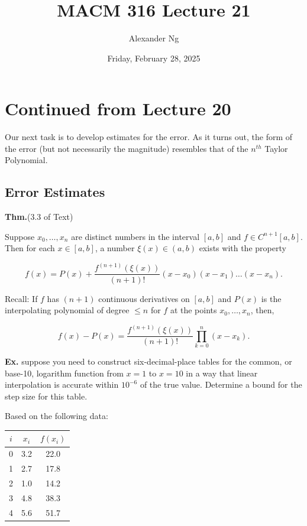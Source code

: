 \documentclass[12pt]{article}
\newcommand{\thm}{\textbf{Thm.}\xspace}
\newcommand{\Ex}{\textbf{Ex.}\xspace}
\begin{document}
\title{MACM 316 Lecture 21}
\author{Alexander Ng}
\date{Friday, February 28, 2025}

\maketitle

\section{Continued from Lecture 20}

Our next task is to develop estimates for the error. As it turns out, the form
of the error (but not necessarily the magnitude) resembles that of the $n^{th}$
Taylor Polynomial.

\subsection{Error Estimates}

\thm (3.3 of Text)

Suppose $x_0, \dots, x_n$ are distinct numbers in the interval $[a,b]$ and
$f\in C^{n+1}[a,b]$. Then for each $x\in [a,b]$, a number $\xi(x)\in(a,b)$
exists with the property

\[
  f(x) = P(x) + \frac{f^{(n+1)}(\xi(x))}{(n+1)!} (x-x_0) (x-x_1) \dots (x-x_n)
.\]

\begin{center}
\end{center}

Recall: If $f$ has $(n+1)$ continuous derivatives on $[a,b]$ and $P(x)$ is the 
interpolating polynomial of degree $\leq n$ for $f$ at the points 
$x_0, \dots, x_n$, then,

\[
  f(x) - P(x) = \frac{f^{(n+1)}(\xi (x))}{(n+1)!} \prod_{k=0}^{n} (x-x_k)
.\]

\Ex suppose you need to construct six-decimal-place tables for the common, or
base-10, logarithm function from $x=1$ to $x=10$ in a way that linear 
interpolation is accurate within $10^{-6}$ of the true value. Determine a bound
for the step size for this table.

Based on the following data:

\begin{table}[h]
    \centering
    \begin{tabular}{c c c}
        \toprule
        $i$ & $x_i$ & $f(x_i)$ \\
        \midrule
        0 & 3.2 & 22.0 \\
        1 & 2.7 & 17.8 \\
        2 & 1.0 & 14.2 \\
        3 & 4.8 & 38.3 \\
        4 & 5.6 & 51.7 \\
        \bottomrule
    \end{tabular}
\end{table}
\end{document}
